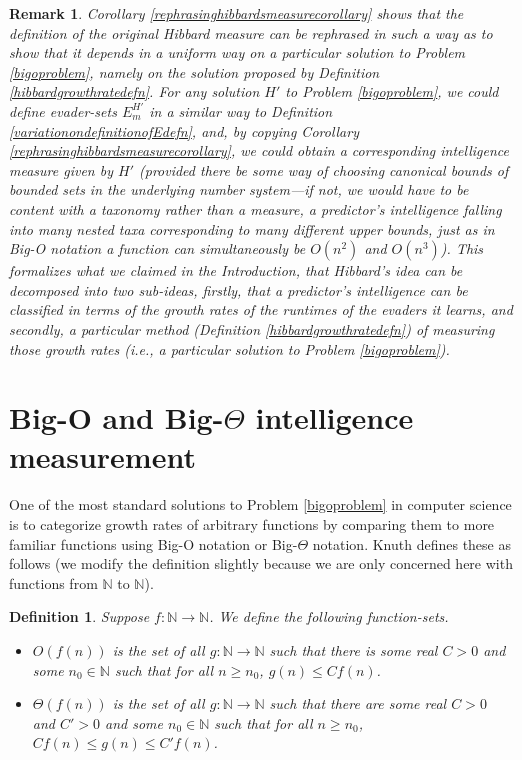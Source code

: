 \documentclass{article}
\newtheorem{definition}[theorem]{Definition}
\newtheorem{remark}[theorem]{Remark}
\begin{document}
\begin{remark}
\label{epiphanyremark}
Corollary \ref{rephrasinghibbardsmeasurecorollary} shows that
the definition of the original Hibbard measure can be rephrased in such a way
as to show that it depends in a uniform way on a particular solution to
Problem \ref{bigoproblem}, namely on the solution proposed by
Definition \ref{hibbardgrowthratedefn}. For \emph{any} solution $H'$ to
Problem \ref{bigoproblem}, we could define evader-sets $E^{H'}_m$ in a similar
way to Definition \ref{variationondefinitionofEdefn}, and, by copying
Corollary \ref{rephrasinghibbardsmeasurecorollary}, we could obtain a corresponding
intelligence measure given by $H'$
(provided there be some way of choosing canonical bounds of bounded sets in the
underlying number system---if not, we would have to be content with a taxonomy
rather than a measure, a predictor's intelligence falling into many nested
taxa corresponding to many different upper bounds, just as in Big-O notation a
function can simultaneously be $O(n^2)$ and $O(n^3)$).
This formalizes what we claimed in the Introduction,
that Hibbard's idea can be decomposed into two sub-ideas, firstly, that a predictor's
intelligence can be classified in terms of the growth rates of the runtimes of the
evaders it learns, and secondly, a particular method
(Definition \ref{hibbardgrowthratedefn})
of measuring those growth rates (i.e., a particular solution to
Problem \ref{bigoproblem}).
\end{remark}


\section{Big-O and Big-$\Theta$ intelligence measurement}
\label{bigosection}

One of the most standard solutions
to Problem \ref{bigoproblem} in computer science is to categorize
growth rates of arbitrary functions by comparing them to more familiar functions using
Big-O notation or Big-$\Theta$ notation.
Knuth defines \cite{knuth1976big} these as follows
(we modify the definition slightly because
we are only concerned here with functions from $\mathbb N$ to $\mathbb N$).

\begin{definition}
\label{bigodefn}
    Suppose $f:\mathbb N\to\mathbb N$. We define the following function-sets.
    \begin{itemize}
        \item
        $O(f(n))$ is the set of all $g:\mathbb N\to\mathbb N$ such that
        there is some real $C>0$ and some $n_0\in\mathbb N$ such that
        for all $n\geq n_0$, $g(n)\leq Cf(n)$.
        \item
        $\Theta(f(n))$ is the set of all $g:\mathbb N\to\mathbb N$ such that
        there are some real $C>0$ and $C'>0$ and some $n_0\in\mathbb N$ such that
        for all $n\geq n_0$, $Cf(n)\leq g(n)\leq C'f(n)$.
    \end{itemize}
\end{definition}
\end{document}
